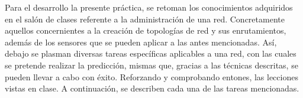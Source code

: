 \noindent
Para el desarrollo la presente práctica, se retoman los conocimientos adquiridos en el salón de clases referente a la administración de una red. Concretamente aquellos concernientes a la creación de topologías de red y sus enrutamientos, además de los sensores que se pueden aplicar a las antes mencionadas.
\newline
Así, debajo se plasman diversas tareas específicas aplicables a una red, con las cuales se pretende realizar la predicción, mismas que, gracias a las técnicas descritas, se pueden llevar a cabo con éxito. Reforzando y comprobando entones, las lecciones vistas en clase.
\newline
A continuación, se describen cada una de las tareas mencionadas.